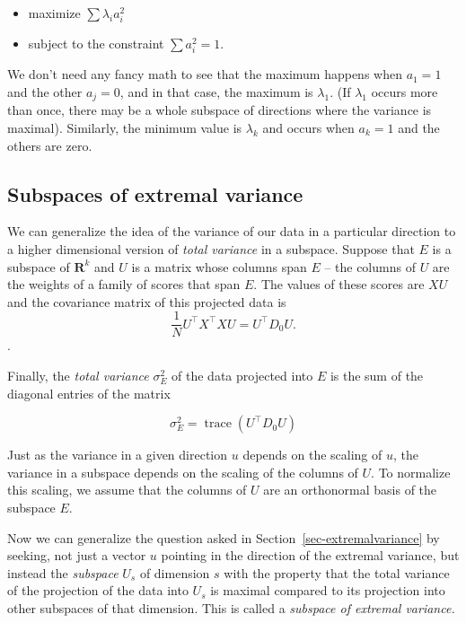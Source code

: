 \documentclass[
  11pt,
  letterpaper,
]{scrbook}
\providecommand{\tightlist}{%
  \setlength{\itemsep}{0pt}\setlength{\parskip}{0pt}}\usepackage{longtable,booktabs,array}
\theoremstyle{plain}
\theoremstyle{plain}
\theoremstyle{remark}
\begin{document}
\begin{itemize}
\tightlist
\item
  maximize \(\sum \lambda_{i}a_{i}^2\)
\item
  subject to the constraint \(\sum a_{i}^2 = 1\).
\end{itemize}

We don't need any fancy math to see that the maximum happens when
\(a_{1}=1\) and the other \(a_{j}=0\), and in that case, the maximum is
\(\lambda_{1}\). (If \(\lambda_{1}\) occurs more than once, there may be
a whole subspace of directions where the variance is maximal).
Similarly, the minimum value is \(\lambda_{k}\) and occurs when
\(a_{k}=1\) and the others are zero.

\hypertarget{sec-subspaces}{%
\subsection{Subspaces of extremal variance}\label{sec-subspaces}}

We can generalize the idea of the variance of our data in a particular
direction to a higher dimensional version of \emph{total variance} in a
subspace. Suppose that \(E\) is a subspace of \(\mathbf{R}^{k}\) and
\(U\) is a matrix whose columns span \(E\) -- the columns of \(U\) are
the weights of a family of scores that span \(E\). The values of these
scores are \(XU\) and the covariance matrix of this projected data is
\[\frac{1}{N}U^{\intercal}X^{\intercal}XU=U^{\intercal}D_{0}U.\].

Finally, the \emph{total variance} \(\sigma_{E}^2\) of the data
projected into \(E\) is the sum of the diagonal entries of the matrix

\[
\sigma^2_{E} = \mathop{trace}(U^{\intercal}D_{0}U)
\]

Just as the variance in a given direction \(u\) depends on the scaling
of \(u\), the variance in a subspace depends on the scaling of the
columns of \(U\). To normalize this scaling, we assume that the columns
of \(U\) are an orthonormal basis of the subspace \(E\).

Now we can generalize the question asked in
Section~\ref{sec-extremalvariance} by seeking, not just a vector \(u\)
pointing in the direction of the extremal variance, but instead the
\emph{subspace} \(U_{s}\) of dimension \(s\) with the property that the
total variance of the projection of the data into \(U_{s}\) is maximal
compared to its projection into other subspaces of that dimension. This
is called a \emph{subspace of extremal variance.}
\end{document}
